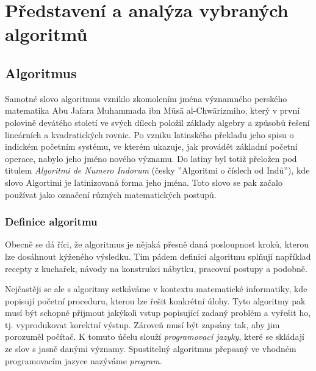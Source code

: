 \documentclass[12pt]{report}			%
\begin{document}
		
				
	\part{Představení a analýza vybraných algoritmů}
	
		\chapter{Algoritmus}
		Samotné slovo algoritmus vzniklo zkomolením jména významného perského matematika Abu Jafara Muhammada ibn Mūsā al-Chwārizmiho, který v první polovině devátého století ve svých
dílech položil základy algebry a způsobů řešení lineárních a kvadratických rovnic. Po vzniku latinského překladu
jeho spisu o indickém početním systému, ve kterém ukazuje, jak provádět základní početní
operace, nabylo jeho jméno nového významu. Do latiny byl totiž přeložen pod titulem \emph{Algoritmi de Numero Indorum} (česky ”Algoritmi o číslech od Indů”), kde slovo Algortimi je latinizovaná
forma jeho jména. Toto slovo se pak začalo používat jako označení různých
matematických postupů. \cite{cerny} \cite{neckar} \cite{mehri}
			
		
			
			\section{Definice algoritmu}
			Obecně se dá říci, že algoritmus je nějaká přesně daná posloupnost kroků, kterou lze dosáhnout kýženého výsledku. Tím pádem definici algoritmu splňují například recepty z kuchařek, návody na konstrukci nábytku, pracovní postupy a podobně. \cite{neckar}
			
			
			Nejčastěji se ale s algoritmy setkáváme v kontextu matematické informatiky, kde popisují početní proceduru, kterou lze řešit konkrétní úlohy. Tyto algoritmy pak musí být schopné přijmout jakýkoli vstup popisující zadaný problém a vyřešit ho, tj. vyprodukovat korektní výstup. Zároveň musí být zapsány tak, aby jim porozuměl počítač. K tomuto účelu slouží \emph{programovací jazyky}, které se skládají ze slov s jasně danými významy. Spustitelný algoritmus přepsaný ve vhodném programovacím jazyce nazýváme \emph{program}. \cite{dvorsky} 
			\newpage
			
\end{document}
